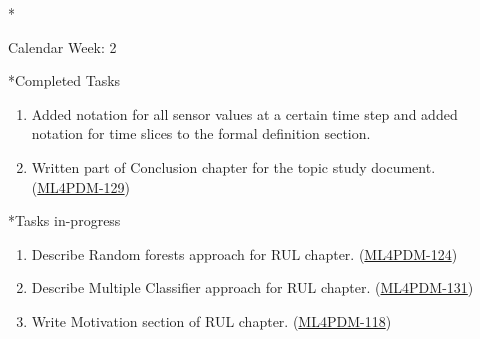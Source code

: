 \documentclass[11pt,a4paper]{article}
\begin{document}
\newpage
\begin{section}*{Calendar Week: 2 \hfill \date{15 January, 2021}}
 \begin{refsection}
   \begin{subsection}*{Completed Tasks}
     \begin{enumerate}
       \item
             Added notation for all sensor values at a certain time step and added notation for time slices to the formal definition section.
       \item
             Written part of Conclusion chapter for the topic study document.\\(\href{https://ml4pdm.atlassian.net/browse/ML4PDM-129}{ML4PDM-129})
     \end{enumerate}
   \end{subsection}

   \begin{subsection}*{Tasks in-progress}
     \begin{enumerate}
       \item
             Describe Random forests approach \cite{GSCH:jennings2016forecasting, GSCH:cutler2012random} for RUL chapter. (\href{https://ml4pdm.atlassian.net/browse/ML4PDM-124}{ML4PDM-124})
       \item
             Describe Multiple Classifier approach \cite{DBLP:journals/tii/SustoSPMB15} for RUL chapter. (\href{https://ml4pdm.atlassian.net/browse/ML4PDM-131}{ML4PDM-131})
       \item
             Write Motivation section of RUL chapter. (\href{https://ml4pdm.atlassian.net/browse/ML4PDM-118}{ML4PDM-118})
     \end{enumerate}
   \end{subsection}

   \printbibliography
 \end{refsection}
\end{section}
\end{document}
